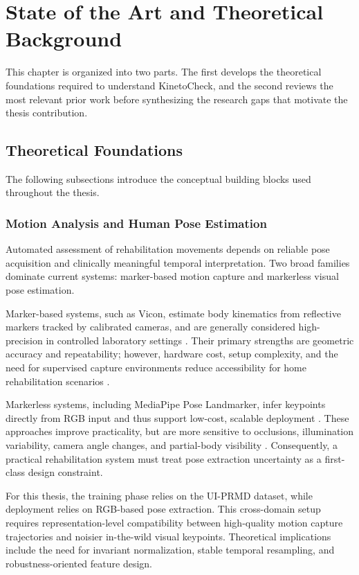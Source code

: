 \chapter{State of the Art and Theoretical Background}
\label{chap:theory}

This chapter is organized into two parts. The first develops the theoretical foundations required to understand KinetoCheck, and the second reviews the most relevant prior work before synthesizing the research gaps that motivate the thesis contribution.

\section{Theoretical Foundations}
\label{sec:theory-foundations}

The following subsections introduce the conceptual building blocks used throughout the thesis.

\subsection{Motion Analysis and Human Pose Estimation}
\label{subsec:motion-analysis}

Automated assessment of rehabilitation movements depends on reliable pose acquisition and clinically meaningful temporal interpretation. Two broad families dominate current systems: marker-based motion capture and markerless visual pose estimation.

Marker-based systems, such as Vicon, estimate body kinematics from reflective markers tracked by calibrated cameras, and are generally considered high-precision in controlled laboratory settings \cite{ZGAA25}. Their primary strengths are geometric accuracy and repeatability; however, hardware cost, setup complexity, and the need for supervised capture environments reduce accessibility for home rehabilitation scenarios \cite{ZGAA25}.

Markerless systems, including MediaPipe Pose Landmarker, infer keypoints directly from RGB input and thus support low-cost, scalable deployment \cite{LTN+19,BGR+20,CSWS17}. These approaches improve practicality, but are more sensitive to occlusions, illumination variability, camera angle changes, and partial-body visibility \cite{BGR+20,CSWS17}. Consequently, a practical rehabilitation system must treat pose extraction uncertainty as a first-class design constraint.

For this thesis, the training phase relies on the UI-PRMD dataset, while deployment relies on RGB-based pose extraction. This cross-domain setup requires representation-level compatibility between high-quality motion capture trajectories and noisier in-the-wild visual keypoints. Theoretical implications include the need for invariant normalization, stable temporal resampling, and robustness-oriented feature design.

